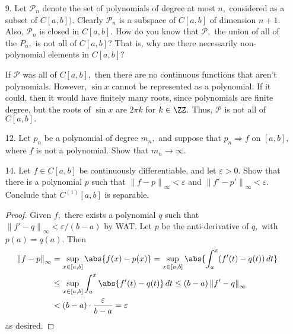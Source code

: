 \documentclass{article}
\begin{document}
\begin{itemize}
	\item[9.] Let $\mathcal P_n$ denote the set of polynomials of degree at most $n,$ considered as a subset of $C[a, b]).$ Clearly $\mathcal P_n$ is a subspace of $C[a, b]$ of dimension $n+1.$ Also, $\mathcal P_n$ is closed in $C[a, b].$ How do you know that $\mathcal P,$ the union of all of the $P_n,$ is not all of $C[a, b]?$ That is, why are there necessarily non-polynomial elements in $C[a, b]?$
		\begin{soln}
			If $\mathcal P$ was all of $C[a, b],$ then there are no continuous functions that aren't polynomials. However, $\sin x$ cannot be represented as a polynomial. If it could, then it would have finitely many roots, since polynomials are finite degree, but the roots of $\sin x$ are $2\pi k$ for $k\in\ZZ.$ Thus, $\mathcal P$ is not all of $C[a, b].$
		\end{soln}

	\item[12.] Let $p_n$ be a polynomial of degree $m_n,$ and suppose that $p_n\Rightarrow f$ on $[a, b],$ where $f$ is not a polynomial. Show that $m_n\to \infty.$

	\item[14.] Let $f\in C[a, b]$ be continuously differentiable, and let $\varepsilon>0.$ Show that there is a polynomial $p$ such that $\left\lVert f-p \right\rVert_\infty<\varepsilon$ and $\left\lVert f'-p' \right\rVert_\infty<\varepsilon.$ Conclude that $C^{(1)}[a, b]$ is separable.
		\begin{proof}
			Given $f,$ there exists a polynomial $q$ such that $\left\lVert f'-q \right\rVert_\infty<\varepsilon/(b-a)$ by WAT. Let $p$ be the anti-derivative of $q,$ with $p(a)=q(a).$ Then
			\begin{align*}
				\left\lVert f-p \right\rVert_\infty &= \sup_{x\in[a, b]} \abs{f(x)-p(x)} = \sup_{x\in [a, b]} \abs{\int_a^x (f'(t)-q(t))\, dt} \\
				&\le \sup_{x\in [a, b]} \int_a^x \abs{f'(t)-q(t)}\, dt \le (b-a)\left\lVert f'-q \right\rVert_\infty \\
				&< (b-a)\cdot \frac{\varepsilon}{b-a} = \varepsilon
			\end{align*}
			as desired.
		\end{proof}


\end{itemize}
\end{document}
